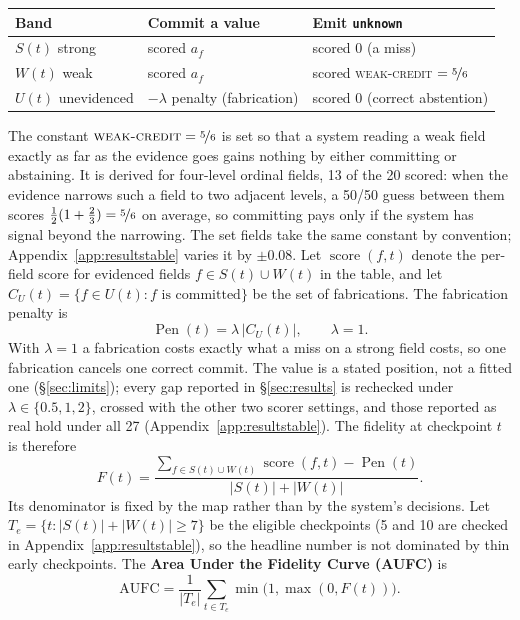 \documentclass{article}
\begin{document}
\begin{center}
\begin{tabular}{@{}lll@{}}
  \toprule
  Band & Commit a value & Emit \texttt{unknown} \\
  \midrule
  $S(t)$ strong & scored $a_f$ & scored $0$ (a miss) \\
  $W(t)$ weak   & scored $a_f$ & scored \textsc{weak-credit} $=\nicefrac{5}{6}$ \\
  $U(t)$ unevidenced & $-\lambda$ penalty (fabrication) & scored $0$ (correct abstention) \\
  \bottomrule
\end{tabular}
\end{center}

The constant $\textsc{weak-credit} = \nicefrac{5}{6}$ is set so that a system reading a weak field
exactly as far as the evidence goes gains nothing by either committing or abstaining. It is derived
for four-level ordinal fields, 13 of the 20 scored: when the evidence narrows such a field to two
adjacent levels, a 50/50 guess between them scores $\frac{1}{2}(1 + \frac{2}{3}) = \nicefrac{5}{6}$
on average, so committing pays only if the system has signal beyond the narrowing. The set fields
take the same constant by convention; Appendix~\ref{app:resultstable} varies it by $\pm 0.08$.
Let $\operatorname{score}(f,t)$ denote the per-field score for evidenced fields $f \in S(t)\cup W(t)$ in the table, and let
$C_U(t)=\{f\in U(t): f\text{ is committed}\}$ be the set of fabrications. The fabrication penalty
is
\[
  \operatorname{Pen}(t)=\lambda\,|C_U(t)|, \qquad \lambda=1.
\]
With $\lambda=1$ a fabrication costs exactly what a miss on a strong field costs, so one fabrication
cancels one correct commit. The value is a stated position, not a fitted one
(\S\ref{sec:limits}); every gap reported in \S\ref{sec:results} is rechecked under
$\lambda\in\{0.5,1,2\}$, crossed with the other two scorer settings, and those reported as real hold
under all 27 (Appendix~\ref{app:resultstable}).
The fidelity at checkpoint $t$ is therefore
\[
  F(t)=\frac{\displaystyle\sum_{f\in S(t)\cup W(t)}\operatorname{score}(f,t)
  -\operatorname{Pen}(t)}{|S(t)|+|W(t)|}.
\]
Its denominator is fixed by the map rather than by the system's decisions. Let
$T_e=\{t: |S(t)|+|W(t)|\ge 7\}$ be the eligible checkpoints (5 and 10 are checked in
Appendix~\ref{app:resultstable}), so the headline number is not dominated by thin early
checkpoints. The \textbf{Area Under the Fidelity Curve (AUFC)} is
\[
  \mathrm{AUFC}=\frac{1}{|T_e|}\sum_{t\in T_e}\min\bigl(1,\max(0,F(t))\bigr).
\]
\end{document}
